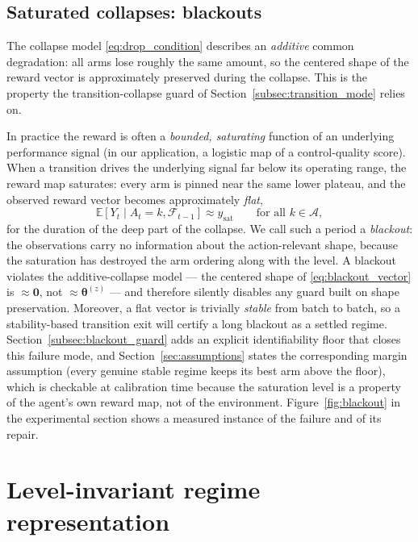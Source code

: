 \documentclass[11pt]{article}
\newcommand{\A}{\mathcal A}
\newcommand{\F}{\mathcal F}
\newcommand{\E}{\mathbb E}
\begin{document}
\subsection{Saturated collapses: blackouts}
\label{subsec:blackouts}

The collapse model \eqref{eq:drop_condition} describes an \emph{additive} common degradation: all arms lose roughly the same amount, so the centered shape of the reward vector is approximately preserved during the collapse. This is the property the transition-collapse guard of Section~\ref{subsec:transition_mode} relies on.

In practice the reward is often a \emph{bounded, saturating} function of an underlying performance signal (in our application, a logistic map of a control-quality score). When a transition drives the underlying signal far below its operating range, the reward map saturates: every arm is pinned near the same lower plateau, and the observed reward vector becomes approximately \emph{flat},
\begin{equation}
\label{eq:blackout_vector}
\E[Y_t\mid A_t=k,\F_{t-1}]\approx y_{\mathrm{sat}}
\qquad\text{for all }k\in\A,
\end{equation}
for the duration of the deep part of the collapse. We call such a period a \emph{blackout}: the observations carry no information about the action-relevant shape, because the saturation has destroyed the arm ordering along with the level. A blackout violates the additive-collapse model --- the centered shape of \eqref{eq:blackout_vector} is $\approx\bm 0$, not $\approx\bm\theta^{(z)}$ --- and therefore silently disables any guard built on shape preservation. Moreover, a flat vector is trivially \emph{stable} from batch to batch, so a stability-based transition exit will certify a long blackout as a settled regime. Section~\ref{subsec:blackout_guard} adds an explicit identifiability floor that closes this failure mode, and Section~\ref{sec:assumptions} states the corresponding margin assumption (every genuine stable regime keeps its best arm above the floor), which is checkable at calibration time because the saturation level is a property of the agent's own reward map, not of the environment. Figure~\ref{fig:blackout} in the experimental section shows a measured instance of the failure and of its repair.

\section{Level-invariant regime representation}
\label{sec:shape_representation}
\end{document}
